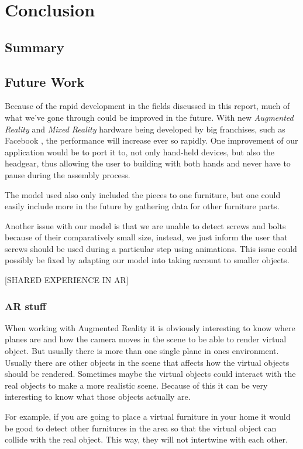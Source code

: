 \section{Conclusion}

\subsection{Summary}

\subsection{Future Work}
Because of the rapid development in the fields discussed in this report, much of what we've gone through could be improved in the future. With new \textit{Augmented Reality} and \textit{Mixed Reality} hardware being developed by big franchises, such as Facebook \cite{facebookAR}, the performance will increase ever so rapidly. 
One improvement of our application would be to port it to, not only hand-held devices, but also the headgear, thus allowing the user to building with both hands and never have to pause during the assembly process. 

The model used also only included the pieces to one furniture, but one could easily include more in the future by gathering data for other furniture parts. 

Another issue with our model is that we are unable to detect screws and bolts because of their comparatively small size, instead, we just inform the user that screws should be used during a particular step using animations. This issue could possibly be fixed by adapting our model into taking account to smaller objects.

[SHARED EXPERIENCE IN AR]

\subsubsection{AR stuff}
When working with Augmented Reality it is obviously interesting to know where planes are and how the camera moves in the scene to be able to render virtual object. But usually there is more than one single plane in ones environment. Usually there are other objects in the scene that affects how the virtual objects should be rendered. Sometimes maybe the virtual objects could interact with the real objects to make a more realistic scene. Because of this it can be very interesting to know what those objects actually are.

For example, if you are going to place a virtual furniture in your home it would be good to detect other furnitures in the area so that the virtual object can collide with the real object. This way, they will not intertwine with each other.


